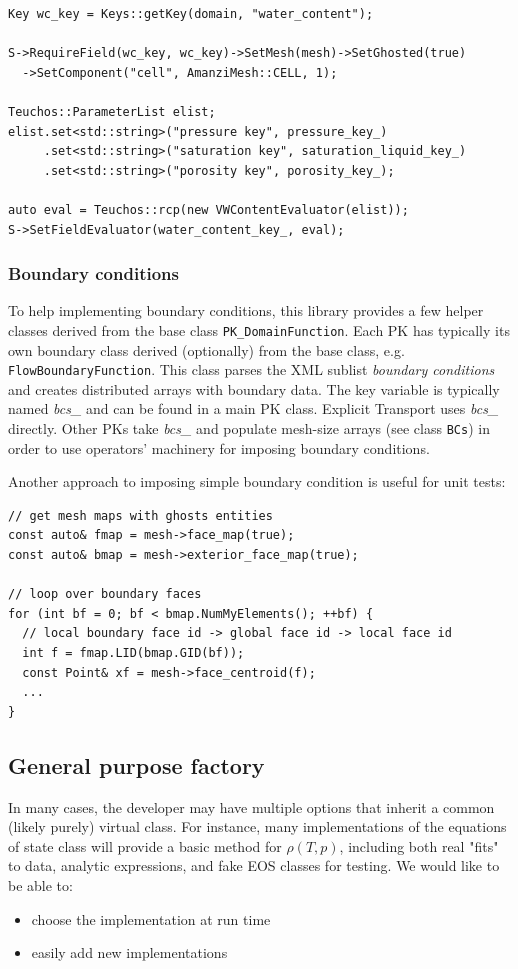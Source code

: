 \begin{lstlisting}
Key wc_key = Keys::getKey(domain, "water_content"); 

S->RequireField(wc_key, wc_key)->SetMesh(mesh)->SetGhosted(true)
  ->SetComponent("cell", AmanziMesh::CELL, 1);

Teuchos::ParameterList elist;
elist.set<std::string>("pressure key", pressure_key_)
     .set<std::string>("saturation key", saturation_liquid_key_)
     .set<std::string>("porosity key", porosity_key_);

auto eval = Teuchos::rcp(new VWContentEvaluator(elist));
S->SetFieldEvaluator(water_content_key_, eval);
\end{lstlisting}
 

\subsubsection{Boundary conditions}
To help implementing boundary conditions, this library provides a few helper 
classes derived from the base class {\tt PK\_DomainFunction}.
Each PK has typically its own boundary class derived (optionally) from the
base class, e.g. {\tt FlowBoundaryFunction}.
This class parses the XML sublist {\it boundary conditions} and creates 
distributed arrays with boundary data. The key variable is typically named 
{\it bcs\_} and can be found in a main PK class.
Explicit Transport uses {\it bcs\_} directly.
Other PKs take {\it bcs\_} and populate mesh-size arrays (see class {\tt BCs})
in order to use operators' machinery for imposing boundary conditions.

Another approach to imposing simple boundary condition is useful for unit tests:

\begin{lstlisting}
// get mesh maps with ghosts entities
const auto& fmap = mesh->face_map(true);
const auto& bmap = mesh->exterior_face_map(true);

// loop over boundary faces
for (int bf = 0; bf < bmap.NumMyElements(); ++bf) {
  // local boundary face id -> global face id -> local face id
  int f = fmap.LID(bmap.GID(bf));
  const Point& xf = mesh->face_centroid(f);
  ...
}
\end{lstlisting}




\clearpage
\subsection{General purpose factory}
In many cases, the developer may have multiple options that inherit a
common (likely purely) virtual class.  
For instance, many implementations of the equations of state class will 
provide a basic method for $\rho(T,p)$,  including both real "fits" to 
data, analytic expressions, and fake EOS classes for testing. 
We would like to be able to:
\begin{itemize}
\item choose the implementation at run time
\item easily add new implementations
\end{itemize}

